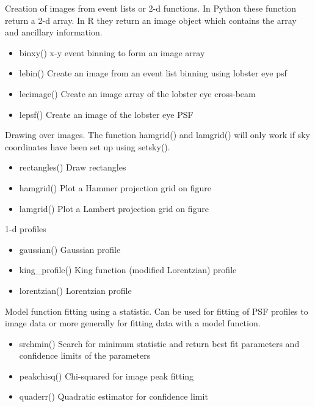 \documentclass[letterpaper,10pt,english]{sphinxmanual}
\begin{document}
Creation of images from event lists or 2-d functions.
In Python these function return a 2-d array. In R they return
an image object which contains the array and ancillary information.
\begin{itemize}
\item {} 
binxy() x-y event binning to form an image array

\item {} 
lebin() Create an image from an event list binning using lobster eye psf

\item {} 
lecimage() Create an image array of the lobster eye cross-beam

\item {} 
lepsf() Create an image of the lobster eye PSF

\end{itemize}

Drawing over images. The function hamgrid() and lamgrid() will only work if
sky coordinates have been set up using setsky().
\begin{itemize}
\item {} 
rectangles() Draw rectangles

\item {} 
hamgrid() Plot a Hammer projection grid on figure

\item {} 
lamgrid() Plot a Lambert projection grid on figure

\end{itemize}

1-d profiles
\begin{itemize}
\item {} 
gaussian() Gaussian profile

\item {} 
king\_profile() King function (modified Lorentzian) profile

\item {} 
lorentzian() Lorentzian profile

\end{itemize}

Model function fitting using a statistic. Can be used for fitting of PSF profiles to image data or more generally for fitting data with a model function.
\begin{itemize}
\item {} 
srchmin() Search for minimum statistic and return best fit parameters and confidence limits of the parameters

\item {} 
peakchisq() Chi-squared for image peak fitting

\item {} 
quaderr() Quadratic estimator for confidence limit

\end{itemize}
\end{document}
